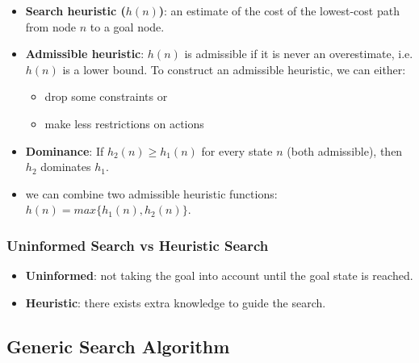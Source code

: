 \documentclass{article}
\begin{document}
\begin{itemize}
    \item \textbf{Search heuristic ($h(n)$)}: an estimate of the cost of the lowest-cost path from node $n$ to a goal node.
    \item \textbf{Admissible heuristic}: $h(n)$ is admissible if it is never an overestimate, i.e. $h(n)$ is a lower bound. To construct an admissible heuristic, we can either:
    \begin{itemize}
        \item drop some constraints or
        \item make less restrictions on actions
    \end{itemize}
    \item \textbf{Dominance}: If $h_2(n) \geq h_1(n)$ for every state $n$ (both admissible), then $h_2$ dominates $h_1$.
    \item we can combine two admissible heuristic functions: $h(n) = max\{h_1(n), h_2(n)\}$.
\end{itemize}

\subsubsection{Uninformed Search vs Heuristic Search}

\begin{itemize}
    \item \textbf{Uninformed}: not taking the goal into account until the goal state is reached.
    \item \textbf{Heuristic}: there exists extra knowledge to guide the search.
\end{itemize}

\subsection{Generic Search Algorithm}

\begin{algorithmic}
        \EndIf
        \EndFor
    \EndWhile
\end{algorithmic}
\end{document}
